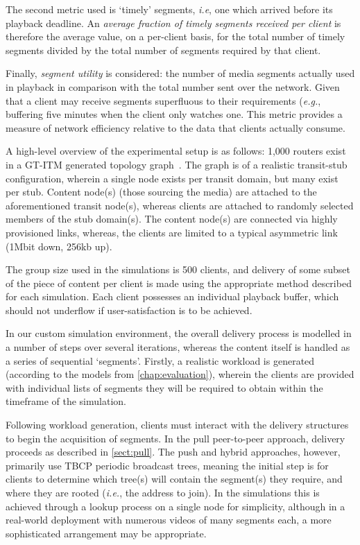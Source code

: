 The second metric used is `timely' segments, \emph{i.e}, one which arrived before its playback deadline. An \emph{average fraction of timely segments received per client} is therefore the average value, on a per-client basis, for the total number of timely segments divided by the total number of segments required by that client.

Finally, \emph{segment utility} is considered: the number of media segments actually used in playback in comparison with the total number sent over the network. Given that a client may receive segments superfluous to their requirements (\emph{e.g.}, buffering five minutes when the client only watches one. This metric provides a measure of network efficiency relative to the data that clients actually consume.


A high-level overview of the experimental setup is as follows: 1,000 routers exist in a GT-ITM generated topology graph~\cite{gtitm}. The graph is of a realistic transit-stub configuration, wherein a single node exists per transit domain, but many exist per stub. Content node(s) (those sourcing the media) are attached to the aforementioned transit node(s), whereas clients are attached to randomly selected members of the stub domain(s). The content node(s) are connected via highly provisioned links, whereas, the clients are limited to a typical asymmetric link (1Mbit down, 256kb up).

The group size used in the simulations is 500 clients, and delivery of some subset of the piece of content per client is made using the appropriate method described for each simulation. Each client possesses an individual playback buffer, which should not underflow if user-satisfaction is to be achieved.

In our custom simulation environment, the overall delivery process is modelled in a number of steps over several iterations, whereas the content itself is handled as a series of sequential `segments'. Firstly, a realistic workload is generated (according to the models from \autoref{chap:evaluation}), wherein the clients are provided with individual lists of segments they will be required to obtain within the timeframe of the simulation.

Following workload generation, clients must interact with the delivery structures to begin the acquisition of segments. In the pull peer-to-peer approach, delivery proceeds as described in \autoref{sect:pull}. The push and hybrid approaches, however, primarily use TBCP periodic broadcast trees, meaning the initial step is for clients to determine which tree(s) will contain the segment(s) they require, and where they are rooted (\emph{i.e.}, the address to join). In the simulations this is achieved through a lookup process on a single node for simplicity, although in a real-world deployment with numerous videos of many segments each, a more sophisticated arrangement may be appropriate.

